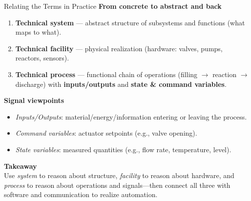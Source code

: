 \begin{frame}{Relating the Terms in Practice}
\textbf{From concrete to abstract and back}
\begin{enumerate}
  \item \textbf{Technical system} — abstract structure of subsystems and functions (what maps to what).
  \item \textbf{Technical facility} — physical realization (hardware: valves, pumps, reactors, sensors).
  \item \textbf{Technical process} — functional chain of operations (filling $\rightarrow$ reaction $\rightarrow$ discharge) with \textbf{inputs/outputs} and \textbf{state \& command variables}.
\end{enumerate}

\vspace{2mm}
\textbf{Signal viewpoints}
\begin{itemize}
  \item \emph{Inputs/Outputs}: material/energy/information entering or leaving the process.
  \item \emph{Command variables}: actuator setpoints (e.g., valve opening).
  \item \emph{State variables}: measured quantities (e.g., flow rate, temperature, level).
\end{itemize}

\vspace{2mm}
\textbf{Takeaway}\\
Use \emph{system} to reason about structure, \emph{facility} to reason about hardware, and \emph{process} to reason about operations and signals—then connect all three with software and communication to realize automation.
\end{frame}

